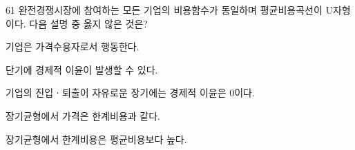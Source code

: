 \begin{question}{61}
완전경쟁시장에 참여하는 모든 기업의 비용함수가 동일하며 평균비용곡선이 U자형이다. 다음 설명 중 옳지 않은 것은?
\begin{choices}
  \item 기업은 가격수용자로서 행동한다.
  \item 단기에 경제적 이윤이 발생할 수 있다.
  \item 기업의 진입ㆍ퇴출이 자유로운 장기에는 경제적 이윤은 0이다.
  \item 장기균형에서 가격은 한계비용과 같다.
  \item 장기균형에서 한계비용은 평균비용보다 높다.
\end{choices}
\end{question}
